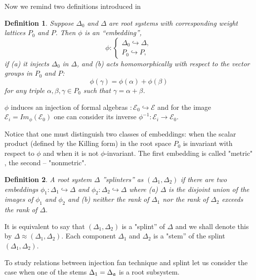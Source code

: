 \documentclass[12pt]{article}
\newtheorem{Def}{Definition}[section]
\begin{document}
Now we remind two definitions introduced in \cite{richter2008splints}

\begin{Def}
Suppose $\Delta _{0}$ and $\Delta $ are root systems with corresponding
weight lattices $P_{0}$ and $P$. Then $\phi $ is an ``embedding'',
\begin{equation}
\phi :\left\{
\begin{array}{l}
\Delta _{0}\hookrightarrow \Delta , \\
P_{0}\hookrightarrow P,
\end{array}
\right.
\end{equation}
if \newline
\noindent (a) it injects $\Delta _{0}$ in $\Delta $, and \newline
\noindent (b) acts homomorphically with respect to the vector groups in $%
P_{0}$ and $P$:
\[
\phi (\gamma )=\phi (\alpha )+\phi (\beta )
\]
for any triple $\alpha ,\beta ,\gamma \in P_{0}$ such that $\gamma =\alpha
+\beta $.
\end{Def}

$\phi$ induces an injection of formal algebras $:{\mathcal{E}}_0
\hookrightarrow \mathcal{E}$ and for the image ${\mathcal{E}}%
_i=Im_{\phi}\left( {\mathcal{E}}_0\right)$ one can consider its inverse $%
\phi^{-1}:{\mathcal{E}}_i \longrightarrow {\mathcal{E}}_0$.

Notice that one must distinguish two classes of embeddings: when the scalar
product (defined by the Killing form) in the root space $P_0$ is invariant
with respect to $\phi$ and when it is not $\phi$-invariant. The first
embedding is called "metric" , the second -- "nonmetric".

\begin{Def}
A root system $\Delta $ ''splinters'' as $(\Delta _{1},\Delta _{2})$ if
there are two embeddings $\phi _{1}:\Delta _{1}\hookrightarrow \Delta $ and $%
\phi _{2}:\Delta _{2}\hookrightarrow \Delta $ where (a) $\Delta $ is the
disjoint union of the images of $\phi _{1}$ and $\phi _{2}$ and (b) neither
the rank of $\Delta _{1}$ nor the rank of $\Delta _{2}$ exceeds the rank of $%
\Delta $.
\end{Def}

It is equivalent to say that $(\Delta_1,\Delta_2)$ is a "splint'' of $\Delta$
and we shall denote this by $\Delta \approx (\Delta_1,\Delta_2)$. Each
component $\Delta_1$ and $\Delta_2$ is a "stem'' of the splint $%
(\Delta_1,\Delta_2)$.

To study relations between injection fan technique and splint let us 
consider the case when one of the stems $\Delta _{1}=\Delta _{\frak{a}}$ 
is a root subsystem.
\end{document}
